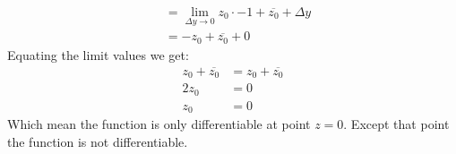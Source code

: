 \begin{example}
\begin{align*}
    &= \lim_{\Delta y\rightarrow 0} z_0\cdot -1 + \overline{z_0} +\Delta y\\
    &= \boxed{-z_0 + \overline{z_0} + 0}
\end{align*}
Equating the limit values we get:
\begin{align*}
    z_0+\overline{z_0} &= z_0 + \overline{z_0}\\
    2z_0 &= 0\\
    z_0 &= 0
\end{align*}
Which mean the function is only differentiable at point $z=0$. Except that point the function is not differentiable. 





\end{example}
